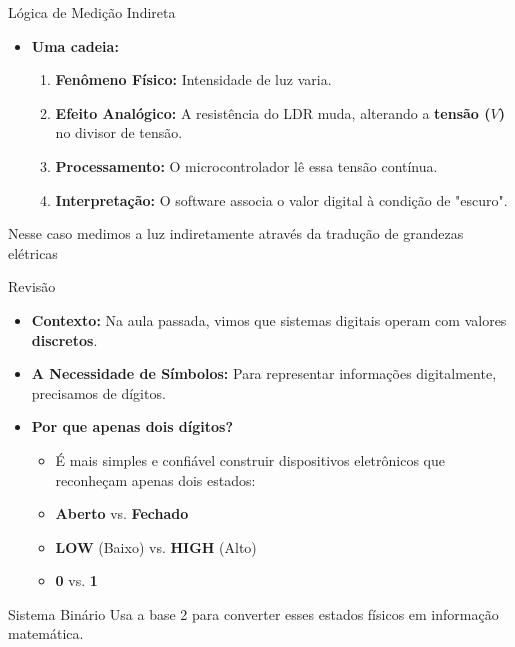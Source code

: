 \begin{frame}{Lógica de Medição Indireta}
    \begin{itemize}
        \item \textbf{Uma cadeia:}
              \begin{enumerate}
                  \item \textbf{Fenômeno Físico:} Intensidade de luz varia.
                  \item \textbf{Efeito Analógico:} A resistência do LDR muda, alterando a \textbf{tensão ($V$)} no divisor de tensão.
                  \item \textbf{Processamento:} O microcontrolador lê essa tensão contínua.
                  \item \textbf{Interpretação:} O software associa o valor digital à condição de "escuro".
              \end{enumerate}
    \end{itemize}



    \vspace{0.3cm}
    \centering
    Nesse caso medimos a luz indiretamente através da tradução de grandezas elétricas
\end{frame}

\begin{frame}{Revisão}
    \begin{itemize}
        \item \textbf{Contexto:} Na aula passada, vimos que sistemas digitais operam com valores \textbf{discretos}.
        \item \textbf{A Necessidade de Símbolos:} Para representar informações digitalmente, precisamos de dígitos.
        \item \textbf{Por que apenas dois dígitos?}
              \begin{itemize}
                  \item É mais simples e confiável construir dispositivos eletrônicos que reconheçam apenas dois estados:
                  \item \textbf{Aberto} vs. \textbf{Fechado}
                  \item \textbf{LOW} (Baixo) vs. \textbf{HIGH} (Alto)
                  \item \textbf{0} vs. \textbf{1}
              \end{itemize}
    \end{itemize}



    \begin{block}{Sistema Binário}
        Usa a base 2 para converter esses estados físicos em informação matemática.
    \end{block}

    \vspace{0.3cm}

\end{frame}
